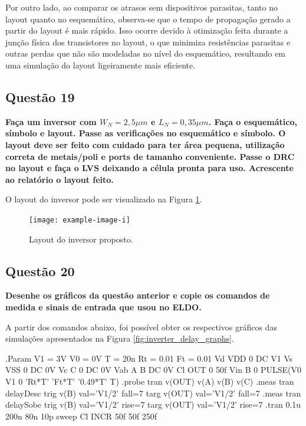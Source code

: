 ﻿\documentclass[12pt,a4paper]{article}
\begin{document}
Por outro lado, ao comparar os atrasos sem dispositivos parasitas, tanto no layout quanto no esquemático, observa-se que o tempo de propagação gerado a partir do layout é mais rápido. Isso ocorre devido à otimização feita durante a junção física dos transistores no layout, o que minimiza resistências parasitas e outras perdas que não são modeladas no nível do esquemático, resultando em uma simulação do layout ligeiramente mais eficiente.

\subsection*{Questão 19}

	\textbf{Faça um inversor com $W_N = 2,5 \mu m$ e $L_N = 0,35 \mu m$. Faça o esquemático, símbolo e layout. Passe as verificações no esquemático e símbolo. O layout deve ser feito com cuidado para ter área pequena, utilização correta de metais/poli e ports de tamanho conveniente. Passe o DRC no layout e faça o LVS deixando a célula pronta para uso. Acrescente ao relatório o layout feito.}

O layout do inversor pode ser visualizado na Figura \ref{fig:inverter_layout}.

\begin{figure}[H]
    \centering
    \texttt{[image: example-image-i]}
    \caption{Layout do inversor proposto.}
    \label{fig:inverter_layout}
\end{figure}

\subsection*{Questão 20}

	\textbf{Desenhe os gráficos da questão anterior e copie os comandos de medida e sinais de entrada que usou no ELDO.}

A partir dos comandos abaixo, foi possível obter os respectivos gráficos das simulações apresentados na Figura \ref{fig:inverter_delay_graphs}.

\begin{codeblock}[title={Comandos ELDO para Inversor}, label={lst:inverter_eldo_commands}, listing options={language=TeX}]
.Param V1 = 3V V0 = 0V T = 20n Rt = 0.01 Ft = 0.01
Vd VDD 0 DC V1
Vs VSS 0 DC 0V
Vc C 0 DC 0V
Vab A B DC 0V
Cl OUT 0 50f
Vin B 0 PULSE(V0 V1 0 'Rt*T' 'Ft*T' '0.49*T' T)
.probe tran v(OUT) v(A) v(B) v(C)
.meas tran delayDesc trig v(B) val='V1/2' fall=7 targ v(OUT) val='V1/2'
fall=7
.meas tran delaySobe trig v(B) val='V1/2' rise=7 targ v(OUT) val='V1/2'
rise=7
.tran 0.1u 200n 80n 10p sweep Cl INCR 50f 50f 250f
\end{codeblock}
\end{document}
